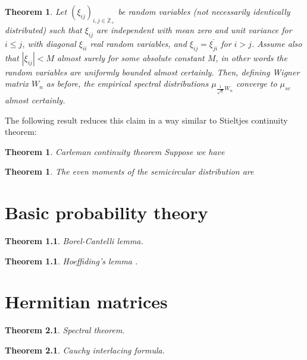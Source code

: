\documentclass[12pt,a4paper,leqno]{report}
\newcommand{\Z}{\mathbb{Z}}
\theoremstyle{plain}
\newtheorem{theo}[equation]{Theorem}
\theoremstyle{definition}
\theoremstyle{remark}
\begin{document}
\begin{theo}
Let $(\xi_{ij})_{i,j \in \Z_+}$ be random variables (not necessarily identically distributed) such that $\xi_{ij}$
are independent with mean zero and unit variance for $i \leq j$, with diagonal $\xi_{ii}$ real random variables, and $\xi_{ij}=\overline{\xi_{ji}}$ for $i>j$. Assume also that $|\xi_{ij}|<M$ almost surely for some absolute constant $M$, in other words the random variables are uniformly bounded almost certainly.
Then, defining Wigner matrix $W_n$ as before, the empirical spectral distributions $\mu_{\frac{1}{\sqrt{n}}W_n}$ converge to $\mu_{sc}$ almost certainly.
\end{theo}

The following result reduces this claim in a way similar to Stieltjes continuity theorem:

\begin{theo}
\emph{Carleman continuity theorem} Suppose we have
\end{theo}

\begin{theo}
The even moments of the semicircular distribution are

\end{theo}

\appendix

\chapter{Basic probability theory}

\begin{theo}
Borel-Cantelli lemma.
\end{theo}

\begin{theo}
Hoeffiding's lemma \cite{Hoef}.
\end{theo}



\chapter{Hermitian matrices}

\begin{theo}
Spectral theorem.
\end{theo}

\begin{theo}
Cauchy interlacing formula.
\end{theo}
\end{document}

